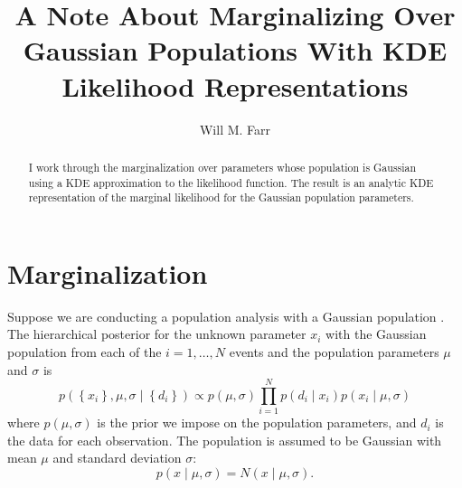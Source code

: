 \documentclass[modern]{aastex631}
\begin{document}
\title{A Note About Marginalizing Over Gaussian Populations With KDE Likelihood Representations}

\author[0000-0003-1540-8562]{Will M. Farr}

\begin{abstract}
    I work through the marginalization over parameters whose population is
    Gaussian using a \ac{KDE} approximation to the likelihood function.  The
    result is an analytic \ac{KDE} representation of the marginal likelihood for
    the Gaussian population parameters. 
\end{abstract}

\section{Marginalization}

Suppose we are conducting a population analysis with a Gaussian population
\citep[e.g.][]{Isi2019,Miller2020}.  The hierarchical posterior for the unknown
parameter $x_i$ with the Gaussian population from each of the $i = 1, \ldots, N$
events and the population parameters $\mu$ and $\sigma$ is 
\begin{equation}
    \label{eq:full-posterior}
    p\left( \left\{ x_i \right\}, \mu, \sigma \mid \left\{ d_i \right\} \right) \propto p\left( \mu, \sigma \right) \prod_{i=1}^N p\left( d_i \mid x_i \right) p\left( x_i \mid \mu, \sigma \right)
\end{equation}
where $p\left( \mu, \sigma \right)$ is the prior we impose on the population
parameters, and $d_i$ is the data for each observation.  The population is
assumed to be Gaussian with mean $\mu$ and standard deviation $\sigma$:
\begin{equation}
    p\left( x \mid \mu, \sigma \right) = N\left( x \mid \mu, \sigma \right).
\end{equation}
\end{document}
